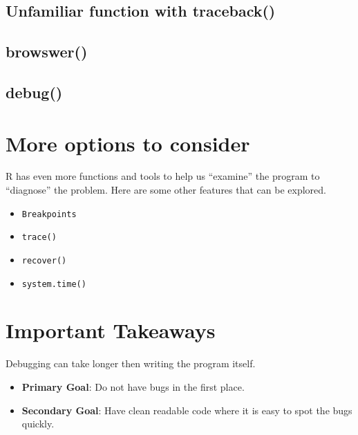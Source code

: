 \documentclass[
]{book}
\providecommand{\tightlist}{%
  \setlength{\itemsep}{0pt}\setlength{\parskip}{0pt}}
\begin{document}
\hypertarget{unfamiliar-function-with-traceback}{%
\subsection*{Unfamiliar function with traceback()}\label{unfamiliar-function-with-traceback}}

\hypertarget{browswer}{%
\subsection{browswer()}\label{browswer}}

\hypertarget{debug}{%
\subsection{debug()}\label{debug}}

\hypertarget{more-options-to-consider}{%
\section{More options to consider}\label{more-options-to-consider}}

R has even more functions and tools to help us ``examine'' the program to ``diagnose'' the problem. Here are some other features that can be explored.

\begin{itemize}
\tightlist
\item
  \texttt{Breakpoints}
\item
  \texttt{trace()}
\item
  \texttt{recover()}
\item
  \texttt{system.time()}
\end{itemize}

\hypertarget{important-takeaways}{%
\section{Important Takeaways}\label{important-takeaways}}

Debugging can take longer then writing the program itself.

\begin{itemize}
\item
  \textbf{Primary Goal}: Do not have bugs in the first place.
\item
  \textbf{Secondary Goal}: Have clean readable code where it is easy to spot the bugs quickly.
\end{itemize}
\end{document}
